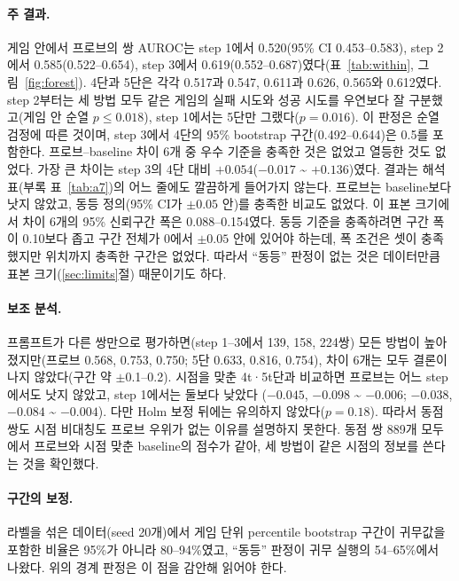 \documentclass[11pt]{article}
\begin{document}
\paragraph{주 결과.} 게임 안에서 프로브의 쌍 AUROC는 step 1에서 0.520(95\% CI 0.453--0.583), step 2에서 0.585(0.522--0.654), step 3에서 0.619(0.552--0.687)였다(표~\ref{tab:within}, 그림~\ref{fig:forest}).
4단과 5단은 각각 0.517과 0.547, 0.611과 0.626, 0.565와 0.612였다. step 2부터는 세 방법 모두 같은 게임의 실패 시도와 성공 시도를 우연보다 잘 구분했고(게임 안 순열 $p \le 0.018$),
step 1에서는 5단만 그랬다($p = 0.016$). 이 판정은 순열 검정에 따른 것이며, step 3에서 4단의 95\% bootstrap 구간(0.492--0.644)은 0.5를 포함한다. 프로브--baseline 차이 6개 중 우수 기준을 충족한 것은 없었고 열등한 것도 없었다. 가장 큰 차이는 step 3의 4단 대비 $+0.054$($-0.017$ \textasciitilde{} $+0.136$)였다.
결과는 해석표(부록 표~\ref{tab:a7})의 어느 줄에도 깔끔하게 들어가지 않는다. 프로브는 baseline보다 낫지 않았고, 동등 정의(95\% CI가 $\pm 0.05$ 안)를 충족한 비교도 없었다. 이 표본 크기에서 차이 6개의 95\% 신뢰구간 폭은 0.088--0.154였다. 동등 기준을 충족하려면 구간 폭이 0.10보다 좁고 구간 전체가 0에서 $\pm 0.05$ 안에 있어야 하는데, 폭 조건은 셋이 충족했지만 위치까지 충족한 구간은 없었다. 따라서 ``동등'' 판정이 없는 것은 데이터만큼 표본 크기(\ref{sec:limits}절) 때문이기도 하다.

\paragraph{보조 분석.} 프롬프트가 다른 쌍만으로 평가하면(step 1--3에서 139, 158, 224쌍) 모든 방법이 높아졌지만(프로브 0.568, 0.753, 0.750; 5단 0.633, 0.816, 0.754),
차이 6개는 모두 결론이 나지 않았다(구간 약 $\pm$0.1--0.2). 시점을 맞춘 4t·5t단과 비교하면 프로브는 어느 step에서도 낫지 않았고, step 1에서는 둘보다 낮았다
($-0.045$, $-0.098$ \textasciitilde{} $-0.006$; $-0.038$, $-0.084$ \textasciitilde{} $-0.004$). 다만 Holm 보정 뒤에는 유의하지 않았다($p = 0.18$). 따라서 동점 쌍도 시점 비대칭도 프로브 우위가 없는 이유를 설명하지 못한다.
동점 쌍 889개 모두에서 프로브와 시점 맞춘 baseline의 점수가 같아, 세 방법이 같은 시점의 정보를 쓴다는 것을 확인했다.

\paragraph{구간의 보정.} 라벨을 섞은 데이터(seed 20개)에서 게임 단위 percentile bootstrap 구간이 귀무값을 포함한 비율은 95\%가 아니라 80--94\%였고,
``동등'' 판정이 귀무 실행의 54--65\%에서 나왔다. 위의 경계 판정은 이 점을 감안해 읽어야 한다.
\end{document}
